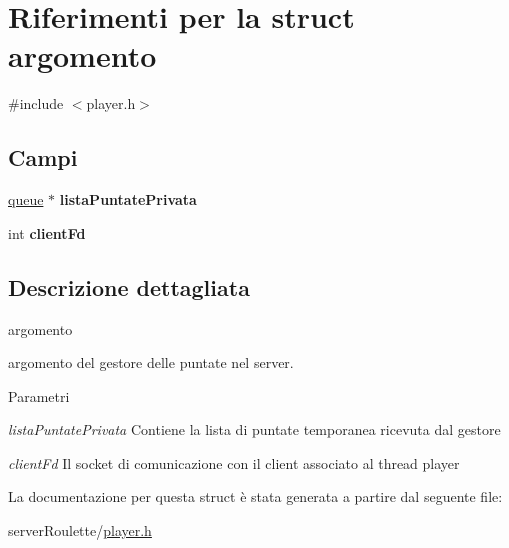 \hypertarget{structargomento}{
\section{Riferimenti per la struct argomento}
\label{structargomento}
}


{\ttfamily \#include $<$player.h$>$}

\subsection*{Campi}
\begin{DoxyCompactItemize}
\item 
\hypertarget{structargomento_a79fda4be21b8c1d52acb07fd02a3561e}{
\hyperlink{structqueue}{queue} $\ast$ {\bfseries listaPuntatePrivata}}
\label{structargomento_a79fda4be21b8c1d52acb07fd02a3561e}

\item 
\hypertarget{structargomento_aa11ca5a41f6a88dbbc3971ddf375509b}{
int {\bfseries clientFd}}
\label{structargomento_aa11ca5a41f6a88dbbc3971ddf375509b}

\end{DoxyCompactItemize}


\subsection{Descrizione dettagliata}
argomento

argomento del gestore delle puntate nel server.


\begin{DoxyParams}{Parametri}
\item[{\em listaPuntatePrivata}]Contiene la lista di puntate temporanea ricevuta dal gestore \item[{\em clientFd}]Il socket di comunicazione con il client associato al thread player \end{DoxyParams}


La documentazione per questa struct è stata generata a partire dal seguente file:\begin{DoxyCompactItemize}
\item 
serverRoulette/\hyperlink{player_8h}{player.h}\end{DoxyCompactItemize}
